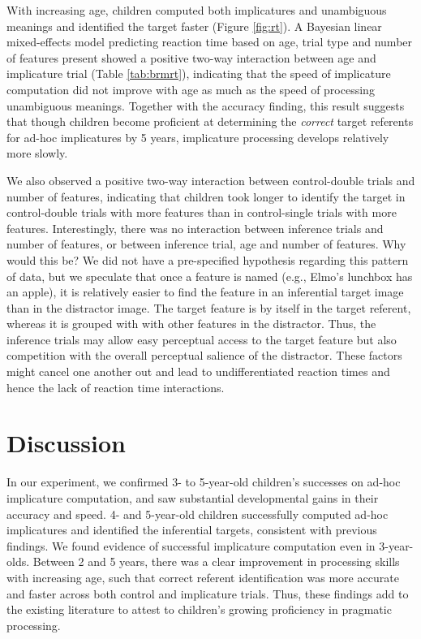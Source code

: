 \documentclass[man]{apa6}
\theoremstyle{definition}
\theoremstyle{definition}
\theoremstyle{definition}
\theoremstyle{remark}
\begin{document}
With increasing age, children computed both implicatures and unambiguous
meanings and identified the target faster (Figure \ref{fig:rt}). A
Bayesian linear mixed-effects model predicting reaction time based on
age, trial type and number of features present showed a positive two-way
interaction between age and implicature trial (Table \ref{tab:brmrt}),
indicating that the speed of implicature computation did not improve
with age as much as the speed of processing unambiguous meanings.
Together with the accuracy finding, this result suggests that though
children become proficient at determining the \emph{correct} target
referents for ad-hoc implicatures by 5 years, implicature processing
develops relatively more slowly.

We also observed a positive two-way interaction between control-double
trials and number of features, indicating that children took longer to
identify the target in control-double trials with more features than in
control-single trials with more features. Interestingly, there was no
interaction between inference trials and number of features, or between
inference trial, age and number of features. Why would this be? We did
not have a pre-specified hypothesis regarding this pattern of data, but
we speculate that once a feature is named (e.g., Elmo's lunchbox has an
apple), it is relatively easier to find the feature in an inferential
target image than in the distractor image. The target feature is by
itself in the target referent, whereas it is grouped with with other
features in the distractor. Thus, the inference trials may allow easy
perceptual access to the target feature but also competition with the
overall perceptual salience of the distractor. These factors might
cancel one another out and lead to undifferentiated reaction times and
hence the lack of reaction time interactions.

\section{Discussion}\label{discussion}

In our experiment, we confirmed 3- to 5-year-old children's successes on
ad-hoc implicature computation, and saw substantial developmental gains
in their accuracy and speed. 4- and 5-year-old children successfully
computed ad-hoc implicatures and identified the inferential targets,
consistent with previous findings. We found evidence of successful
implicature computation even in 3-year-olds. Between 2 and 5 years,
there was a clear improvement in processing skills with increasing age,
such that correct referent identification was more accurate and faster
across both control and implicature trials. Thus, these findings add to
the existing literature to attest to children's growing proficiency in
pragmatic processing.
\end{document}
